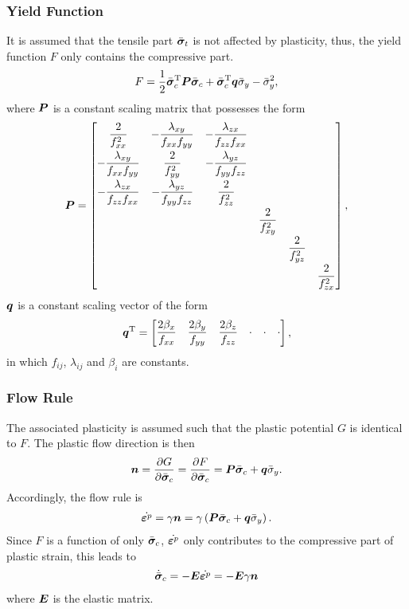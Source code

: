 \subsubsection{Yield Function}
It is assumed that the tensile part $\bar{\bm{\sigma}}_t$ is not affected by plasticity, thus, the yield function $F$ only contains the compressive part.
\begin{gather}
F=\dfrac{1}{2}\bar{\bm{\sigma}}_c^{\mathrm{T}}\bm{P}\bar{\bm{\sigma}}_c+\bar{\bm{\sigma}}_c^{\mathrm{T}}\bm{q}\bar{\sigma}_y-\bar{\sigma}_y^2,
\end{gather}
where $\bm{P}$ is a constant scaling matrix that possesses the form
\begin{gather}
\bm{P}=\begin{bmatrix}
\dfrac{2}{f_{xx}^2}&-\dfrac{\lambda_{xy}}{f_{xx}f_{yy}}&-\dfrac{\lambda_{zx}}{f_{zz}f_{xx}}&&&\\[3mm]
-\dfrac{\lambda_{xy}}{f_{xx}f_{yy}}&\dfrac{2}{f_{yy}^2}&-\dfrac{\lambda_{yz}}{f_{yy}f_{zz}}&&&\\[3mm]
-\dfrac{\lambda_{zx}}{f_{zz}f_{xx}}&-\dfrac{\lambda_{yz}}{f_{yy}f_{zz}}&\dfrac{2}{f_{zz}^2}&&&\\[3mm]
&&&\dfrac{2}{f_{xy}^2}&&\\[3mm]
&&&&\dfrac{2}{f_{yz}^2}&\\[3mm]
&&&&&\dfrac{2}{f_{zx}^2}
\end{bmatrix},
\end{gather}
$\bm{q}$ is a constant scaling vector of the form
\begin{gather}
\bm{q}^{\mathrm{T}}=\begin{bmatrix}
\dfrac{2\beta_x}{f_{xx}}&\dfrac{2\beta_y}{f_{yy}}&\dfrac{2\beta_z}{f_{zz}}&\cdot&\cdot&\cdot
\end{bmatrix},
\end{gather}
in which $f_{ij}$, $\lambda_{ij}$ and $\beta_i$ are constants.
\subsubsection{Flow Rule}
The associated plasticity is assumed such that the plastic potential $G$ is identical to $F$. The plastic flow direction is then
\begin{gather}
\bm{n}=\dfrac{\partial{G}}{\partial{\bar{\bm{\sigma}}_c}}=\dfrac{\partial{F}}{\partial{\bar{\bm{\sigma}}_c}}=\bm{P}\bar{\bm{\sigma}}_c+\bm{q}\bar{\sigma}_y.
\end{gather}
Accordingly, the flow rule is
\begin{gather}
\dot{\bm{\varepsilon}^p}=\gamma\bm{n}=\gamma\left(\bm{P}\bar{\bm{\sigma}}_c+\bm{q}\bar{\sigma}_y\right).
\end{gather}
Since $F$ is a function of only $\bar{\bm{\sigma}}_c$, $\dot{\bm{\varepsilon}^p}$ only contributes to the compressive part of plastic strain, this leads to
\begin{gather}
\dot{\bar{\bm{\sigma}}}_c=-\bm{E}\dot{\bm{\varepsilon}^p}=-\bm{E}\gamma\bm{n}
\end{gather}
where $\bm{E}$ is the elastic matrix.

